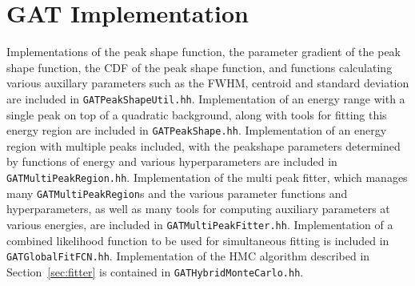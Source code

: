 \documentclass[/main.tex]{subfiles}
\begin{document}
\section{GAT Implementation}
Implementations of the peak shape function, the parameter gradient of the peak shape function, the CDF of the peak shape function, and functions calculating various auxillary parameters such as the FWHM, centroid and standard deviation are included in \texttt{GATPeakShapeUtil.hh}.
Implementation of an energy range with a single peak on top of a quadratic background, along with tools for fitting this energy region are included in \texttt{GATPeakShape.hh}.
Implementation of an energy region with multiple peaks included, with the peakshape parameters determined by functions of energy and various hyperparameters are included in \texttt{GATMultiPeakRegion.hh}.
Implementation of the multi peak fitter, which manages many \texttt{GATMultiPeakRegion}s and the various parameter functions and hyperparameters, as well as many tools for computing auxiliary parameters at various energies, are included in \texttt{GATMultiPeakFitter.hh}.
Implementation of a combined likelihood function to be used for simultaneous fitting is included in \texttt{GATGlobalFitFCN.hh}.
Implementation of the HMC algorithm described in Section~\ref{sec:fitter} is contained in \texttt{GATHybridMonteCarlo.hh}.
\\

\onlyinsubfile{
  
  
}
\end{document}
